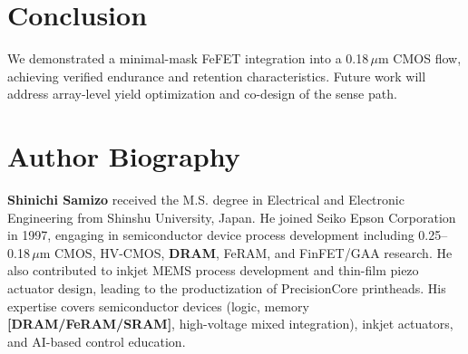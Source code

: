 \documentclass[journal]{IEEEtran}
\begin{document}
\FloatBarrier

\section{Conclusion}
We demonstrated a minimal-mask FeFET integration into a 0.18\,$\mu$m CMOS flow, achieving verified endurance and retention characteristics. Future work will address array-level yield optimization and co-design of the sense path.




\section*{Author Biography}
\noindent\textbf{Shinichi Samizo} received the M.S. degree in Electrical and Electronic Engineering from Shinshu University, Japan. He joined Seiko Epson Corporation in 1997, engaging in semiconductor device process development including 0.25--0.18\,$\mu$m CMOS, HV-CMOS, \textbf{DRAM}, FeRAM, and FinFET/GAA research. He also contributed to inkjet MEMS process development and thin-film piezo actuator design, leading to the productization of PrecisionCore printheads. His expertise covers semiconductor devices (logic, memory \textbf{[DRAM/FeRAM/SRAM]}, high-voltage mixed integration), inkjet actuators, and AI-based control education.
\end{document}
